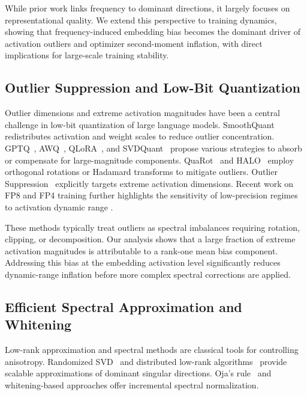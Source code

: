 While prior work links frequency to dominant directions,
it largely focuses on representational quality.
We extend this perspective to training dynamics,
showing that frequency-induced embedding bias becomes the dominant driver
of activation outliers and optimizer second-moment inflation,
with direct implications for large-scale training stability.

\subsection{Outlier Suppression and Low-Bit Quantization}

Outlier dimensions and extreme activation magnitudes have been a central
challenge in low-bit quantization of large language models.
SmoothQuant~\cite{xiao2023smoothquant} redistributes activation and weight
scales to reduce outlier concentration.
GPTQ~\cite{frantar2022gptq}, AWQ~\cite{lin2024awq}, QLoRA~\cite{dettmers2023qlora},
and SVDQuant~\cite{li2024svdquant}
propose various strategies to absorb or compensate for large-magnitude
components.
QuaRot~\cite{ashkboos2024quarot} and HALO~\cite{ashkboos2025halo}
employ orthogonal rotations or Hadamard transforms to mitigate outliers.
Outlier Suppression~\cite{wei2023outlier} explicitly targets extreme
activation dimensions.
Recent work on FP8 and FP4 training further highlights the sensitivity of
low-precision regimes to activation dynamic range
\cite{micikevicius2022fp8,peng2023fp8,perez2023fp8,cao2025metis}.

These methods typically treat outliers as spectral imbalances requiring
rotation, clipping, or decomposition.
Our analysis shows that a large fraction of extreme activation magnitudes
is attributable to a rank-one mean bias component.
Addressing this bias at the embedding activation level
significantly reduces dynamic-range inflation before more complex spectral
corrections are applied.

\subsection{Efficient Spectral Approximation and Whitening}

Low-rank approximation and spectral methods are classical tools for
controlling anisotropy.
Randomized SVD~\cite{halko2011randomized} and distributed low-rank
algorithms~\cite{suresh2017distributed}
provide scalable approximations of dominant singular directions.
Oja’s rule~\cite{oja1982pca} and whitening-based approaches
\cite{huang2021whiteningbert}
offer incremental spectral normalization.

